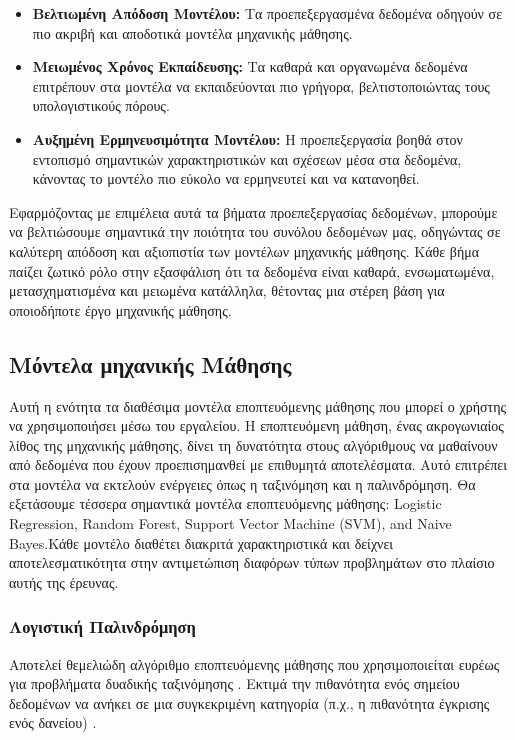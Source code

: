 \documentclass[12pt,twoside]{article}
\newcommand{\en}{\selectlanguage{english}}
\newcommand{\gr}{\selectlanguage{greek}}
\begin{document}
\begin{itemize}
    \item \textbf{Βελτιωμένη Απόδοση Μοντέλου:} Τα προεπεξεργασμένα δεδομένα οδηγούν σε πιο ακριβή και αποδοτικά μοντέλα μηχανικής μάθησης.
    \item \textbf{Μειωμένος Χρόνος Εκπαίδευσης:} Τα καθαρά και οργανωμένα δεδομένα επιτρέπουν στα μοντέλα να εκπαιδεύονται πιο γρήγορα, βελτιστοποιώντας τους υπολογιστικούς πόρους.
    \item \textbf{Αυξημένη Ερμηνευσιμότητα Μοντέλου:} Η προεπεξεργασία βοηθά στον εντοπισμό σημαντικών χαρακτηριστικών και σχέσεων μέσα στα δεδομένα, κάνοντας το μοντέλο πιο εύκολο να ερμηνευτεί και να κατανοηθεί.
\end{itemize}

Εφαρμόζοντας με επιμέλεια αυτά τα βήματα προεπεξεργασίας δεδομένων, μπορούμε να βελτιώσουμε σημαντικά την ποιότητα του συνόλου δεδομένων μας, οδηγώντας σε καλύτερη απόδοση και αξιοπιστία των μοντέλων μηχανικής μάθησης. Κάθε βήμα παίζει ζωτικό ρόλο στην εξασφάλιση ότι τα δεδομένα είναι καθαρά, ενσωματωμένα, μετασχηματισμένα και μειωμένα κατάλληλα, θέτοντας μια στέρεη βάση για οποιοδήποτε έργο μηχανικής μάθησης.


\subsection{\gr Μόντελα μηχανικής Μάθησης}
Αυτή η ενότητα τα διαθέσιμα μοντέλα εποπτευόμενης μάθησης που μπορεί ο χρήστης να χρησιμοποιήσει μέσω του εργαλείου. Η εποπτευόμενη μάθηση, ένας ακρογωνιαίος λίθος της μηχανικής μάθησης, δίνει τη δυνατότητα στους αλγόριθμους να μαθαίνουν από δεδομένα που έχουν προεπισημανθεί με επιθυμητά αποτελέσματα. Αυτό επιτρέπει στα μοντέλα να εκτελούν ενέργειες όπως η ταξινόμηση  και η παλινδρόμηση. Θα εξετάσουμε τέσσερα σημαντικά μοντέλα εποπτευόμενης μάθησης: \en Logistic Regression, Random Forest, Support Vector Machine (SVM), and Naive Bayes.\gr Κάθε μοντέλο διαθέτει διακριτά χαρακτηριστικά και δείχνει αποτελεσματικότητα στην αντιμετώπιση διαφόρων τύπων προβλημάτων στο πλαίσιο αυτής της έρευνας.

\subsubsection{ \gr Λογιστική Παλινδρόμηση}
Αποτελεί θεμελιώδη αλγόριθμο εποπτευόμενης μάθησης που χρησιμοποιείται ευρέως για προβλήματα δυαδικής ταξινόμησης  \cite{hastie2009elements}. Εκτιμά την πιθανότητα ενός σημείου δεδομένων να ανήκει σε μια συγκεκριμένη κατηγορία (π.χ., η πιθανότητα έγκρισης ενός δανείου) \cite{taye2023understanding}.
\end{document}
